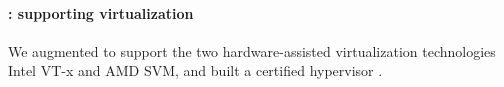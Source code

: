 

\paragraph{\mCTOShyper{}: supporting virtualization}
We augmented \mCTOSbase{} to support the two hardware-assisted
virtualization technologies Intel VT-x and AMD SVM, and built a
certified hypervisor \mCTOShyper{}.

